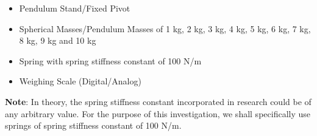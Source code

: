 \begin{itemize}
    \item {Pendulum Stand/Fixed Pivot}
    \item {Spherical Masses/Pendulum Masses of 1 kg, 2 kg, 3 kg, 4 kg, 5 kg, 6 kg, 7 kg, 8 kg, 9 kg and 10 kg}
    \item {Spring with spring stiffness constant of 100 N/m}
    \item {Weighing Scale (Digital/Analog)}
    \label{mat}
\end{itemize}

{\textbf{Note}: In theory, the spring stiffness constant incorporated in research could be of any arbitrary value. For the purpose of this investigation, we shall specifically use springs of spring stiffness constant of 100 N/m.}


